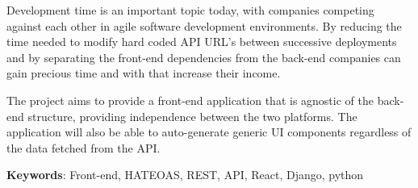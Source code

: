 
Development time is an important topic today, with companies competing against each other in agile software development environments. By reducing the time needed to modify hard coded API URL's between successive deployments and by separating the front-end dependencies from the back-end companies can gain precious time and with that increase their income.

The project aims to provide a front-end application that is agnostic of the back-end structure, providing independence between the two platforms. The application will also be able to auto-generate generic UI components regardless of the data fetched from the API.

\textbf{Keywords}: Front-end, HATEOAS, REST, API, React, Django, python